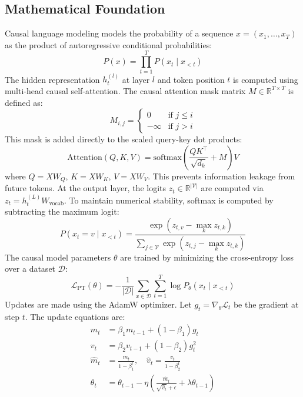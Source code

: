\documentclass{article}
\begin{document}
\subsection{Mathematical Foundation}
Causal language modeling models the probability of a sequence $x = (x_1, \ldots, x_T)$ as the product of autoregressive conditional probabilities:
\begin{equation}
  P(x) = \prod_{t=1}^T P(x_t \mid x_{<t})
\end{equation}
The hidden representation $h_t^{(l)}$ at layer $l$ and token position $t$ is computed using multi-head causal self-attention. The causal attention mask matrix $M \in \mathbb{R}^{T \times T}$ is defined as:
\begin{equation}
  M_{i,j} = \begin{cases} 0 & \text{if } j \le i \\ -\infty & \text{if } j > i \end{cases}
\end{equation}
This mask is added directly to the scaled query-key dot products:
\begin{equation}
  \text{Attention}(Q, K, V) = \text{softmax}\left( \frac{Q K^\top}{\sqrt{d_k}} + M \right) V
\end{equation}
where $Q = X W_Q$, $K = X W_K$, $V = X W_V$. This prevents information leakage from future tokens. At the output layer, the logits $z_t \in \mathbb{R}^{|\mathcal{V}|}$ are computed via $z_t = h_t^{(L)} W_{\text{vocab}}$. To maintain numerical stability, softmax is computed by subtracting the maximum logit:
\begin{equation}
  P(x_t = v \mid x_{<t}) = \frac{\exp(z_{t,v} - \max_k z_{t,k})}{\sum_{j \in \mathcal{V}} \exp(z_{t,j} - \max_k z_{t,k})}
\end{equation}
The causal model parameters $\theta$ are trained by minimizing the cross-entropy loss over a dataset $\mathcal{D}$:
\begin{equation}
  \mathcal{L}_{\text{PT}}(\theta) = -\frac{1}{|\mathcal{D}|}\sum_{x \in \mathcal{D}} \sum_{t=1}^T \log P_\theta(x_t \mid x_{<t})
\end{equation}
Updates are made using the AdamW optimizer. Let $g_t = \nabla_\theta \mathcal{L}_t$ be the gradient at step $t$. The update equations are:
\begin{align}
  m_t &= \beta_1 m_{t-1} + (1-\beta_1) g_t \\
  v_t &= \beta_2 v_{t-1} + (1-\beta_2) g_t^2 \\
  \hat{m}_t &= \frac{m_t}{1-\beta_1^t}, \quad \hat{v}_t = \frac{v_t}{1-\beta_2^t} \\
  \theta_t &= \theta_{t-1} - \eta \left( \frac{\hat{m}_t}{\sqrt{\hat{v}_t} + \epsilon} + \lambda \theta_{t-1} \right)
\end{align}
\end{document}
